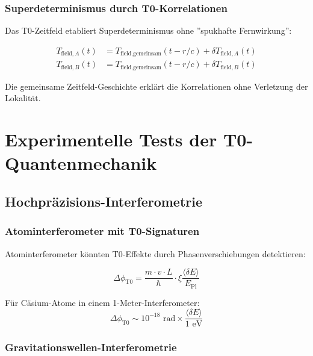 \documentclass[12pt,a4paper]{article}
\newcommand{\xipar}{\xi}
\newcommand{\deltaE}{\delta E}
\newcommand{\EPlanck}{E_{\text{Pl}}}
\begin{document}
	\subsubsection{Superdeterminismus durch T0-Korrelationen}
	
	Das T0-Zeitfeld etabliert Superdeterminismus ohne ''spukhafte Fernwirkung'':
	
	\begin{align}
		T_{\text{field},A}(t) &= T_{\text{field},\text{gemeinsam}}(t-r/c) + \delta T_{\text{field},A}(t) \\
		T_{\text{field},B}(t) &= T_{\text{field},\text{gemeinsam}}(t-r/c) + \delta T_{\text{field},B}(t)
	\end{align}
	
	Die gemeinsame Zeitfeld-Geschichte erklärt die Korrelationen ohne Verletzung der Lokalität.
	
	\section{Experimentelle Tests der T0-Quantenmechanik}
	
	\subsection{Hochpräzisions-Interferometrie}
	
	\subsubsection{Atominterferometer mit T0-Signaturen}
	
	Atominterferometer könnten T0-Effekte durch Phasenverschiebungen detektieren:
	
	\begin{equation}
		\Delta\phi_{\text{T0}} = \frac{m \cdot v \cdot L}{\hbar} \cdot \xipar \frac{\langle\deltaE\rangle}{\EPlanck}
	\end{equation}
	
	Für Cäsium-Atome in einem 1-Meter-Interferometer:
	\begin{equation}
		\Delta\phi_{\text{T0}} \sim 10^{-18} \text{ rad} \times \frac{\langle\deltaE\rangle}{1 \text{ eV}}
	\end{equation}
	
	\subsubsection{Gravitationswellen-Interferometrie}
	
\end{document}
